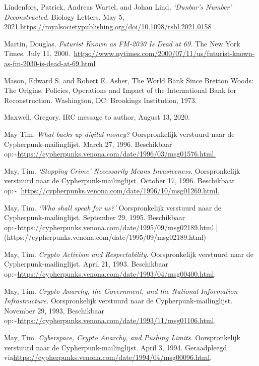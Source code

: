 \documentclass[smalldemyvopaper,11pt,twoside,onecolumn,openright,extrafontsizes,hidelinks]{memoir}
\begin{document}
Lindenfors, Patrick, Andreas Wartel, and Johan Lind, \emph{`Dunbar's
Number' Deconstructed.} Biology Letters. May 5,
2021.\url{https://royalsocietypublishing.org/doi/10.1098/rsbl.2021.0158}

Martin, Douglas. \emph{Futurist Known as FM-2030 Is Dead at 69.} The New
York Times. July 11,
2000.~\url{https://www.nytimes.com/2000/07/11/us/futurist-known-as-fm-2030-is-dead-at-69.html}

Mason, Edward S. and Robert E. Asher, The World Bank Since Bretton
Woods: The Origins, Policies, Operations and Impact of the International
Bank for Reconstruction. Washington, DC: Brookings Institution, 1973.

Maxwell, Gregory. IRC message to author, August 13, 2020.

May Tim. \emph{What backs up digital money?} Oorspronkelijk verstuurd
naar de Cypherpunk-mailinglijst. March 27, 1996. Beschikbaar
op:\textasciitilde{}\href{https://cypherpunks.venona.com/date/1996/03/msg01576.html}{https://cypherpunks.venona.com/date/1996/03/msg01576.html.}

May, Tim. \emph{`Stopping Crime' Necessarily Means Invasiveness.}
Oorspronkelijk verstuurd naar de Cypherpunk-mailinglijst. October 17,
1996. Beschikbaar
op:\textasciitilde~\href{https://cypherpunks.venona.com/date/1996/10/msg01269.html}{https://cypherpunks.venona.com/date/1996/10/msg01269.html.}

May, Tim. \emph{`Who shall speak for us?'} Oorspronkelijk verstuurd naar
de Cypherpunk-mailinglijst. September 29, 1995. Beschikbaar
op:\textasciitilde https://cypherpunks.venona.com/date/1995/09/msg02189.html.{]}(https://cypherpunks.venona.com/date/1995/09/msg02189.html)

May, Tim. \emph{Crypto Activism and Respectability.} Oorspronkelijk
verstuurd naar de Cypherpunk-mailinglijst. April 21, 1993. Beschikbaar
op:\textasciitilde{}\url{https://cypherpunks.venona.com/date/1993/04/msg00400.html}.

May, Tim. \emph{Crypto Anarchy, the Government, and the National
Information Infrastructure.} Oorspronkelijk verstuurd naar de
Cypherpunk-mailinglijst. November 29, 1993, Beschikbaar
op:\textasciitilde{}\url{https://cypherpunks.venona.com/date/1993/11/msg01106.html}.

May, Tim. \emph{Cyberspace, Crypto Anarchy, and Pushing Limits.}
Oorspronkelijk verstuurd naar de Cypherpunk-mailinglijst. April 3, 1994.
Geraadpleegd
via\url{https://cypherpunks.venona.com/date/1994/04/msg00096.html}.
\end{document}
